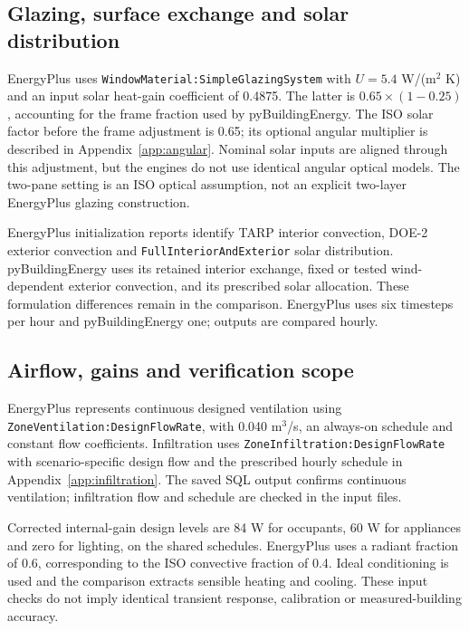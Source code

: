 \subsection{Glazing, surface exchange and solar distribution}
EnergyPlus uses \nolinkurl{WindowMaterial:SimpleGlazingSystem} with $U=5.4$ W/(m$^2$ K) and an input solar heat-gain coefficient of 0.4875. The latter is $0.65\times(1-0.25)$, accounting for the frame fraction used by pyBuildingEnergy. The ISO solar factor before the frame adjustment is 0.65; its optional angular multiplier is described in Appendix~\ref{app:angular}. Nominal solar inputs are aligned through this adjustment, but the engines do not use identical angular optical models. The two-pane setting is an ISO optical assumption, not an explicit two-layer EnergyPlus glazing construction.

EnergyPlus initialization reports identify TARP interior convection, DOE-2 exterior convection and \nolinkurl{FullInteriorAndExterior} solar distribution. pyBuildingEnergy uses its retained interior exchange, fixed or tested wind-dependent exterior convection, and its prescribed solar allocation. These formulation differences remain in the comparison. EnergyPlus uses six timesteps per hour and pyBuildingEnergy one; outputs are compared hourly.

\subsection{Airflow, gains and verification scope}
EnergyPlus represents continuous designed ventilation using \nolinkurl{ZoneVentilation:DesignFlowRate}, with 0.040 m$^3$/s, an always-on schedule and constant flow coefficients. Infiltration uses \nolinkurl{ZoneInfiltration:DesignFlowRate} with scenario-specific design flow and the prescribed hourly schedule in Appendix~\ref{app:infiltration}. The saved SQL output confirms continuous ventilation; infiltration flow and schedule are checked in the input files.

Corrected internal-gain design levels are 84 W for occupants, 60 W for appliances and zero for lighting, on the shared schedules. EnergyPlus uses a radiant fraction of 0.6, corresponding to the ISO convective fraction of 0.4. Ideal conditioning is used and the comparison extracts sensible heating and cooling. These input checks do not imply identical transient response, calibration or measured-building accuracy.
